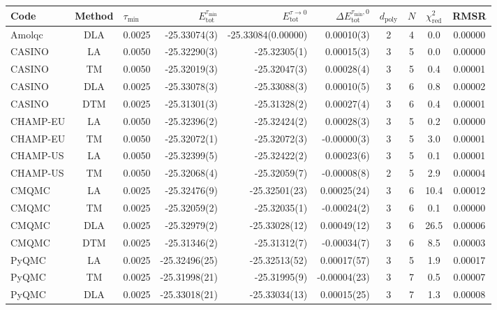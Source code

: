 \begin{tabular}{|lc|lr|r|r|cccc|}
\toprule
Code & Method & $\tau_\text{min}$ & $E_\text{tot}^{\tau_\text{min}}$ & $E_\text{tot}^{\tau\to 0}$ & $\Delta E_\text{tot}^{\tau_\text{min},0}$ & $d_\text{poly}$ & $N$ & $\chi^2_\textrm{red}$ & RMSR \\
\midrule
Amolqc           &  DLA  & 0.0025 & -25.33074(3) & -25.33084(0.00000) & 0.00010(3) & 2 & 4 & 0.0 & 0.00000 \\
CASINO           &  LA   & 0.0050 & -25.32290(3) & -25.32305(1) & 0.00015(3) & 3 & 5 & 0.0 & 0.00000 \\
CASINO           &  TM   & 0.0050 & -25.32019(3) & -25.32047(3) & 0.00028(4) & 3 & 5 & 0.4 & 0.00001 \\
CASINO           &  DLA  & 0.0025 & -25.33078(3) & -25.33088(3) & 0.00010(5) & 3 & 6 & 0.8 & 0.00002 \\
CASINO           &  DTM  & 0.0025 & -25.31301(3) & -25.31328(2) & 0.00027(4) & 3 & 6 & 0.4 & 0.00001 \\
CHAMP-EU         &  LA   & 0.0050 & -25.32396(2) & -25.32424(2) & 0.00028(3) & 3 & 5 & 0.2 & 0.00000 \\
CHAMP-EU         &  TM   & 0.0050 & -25.32072(1) & -25.32072(3) & -0.00000(3) & 3 & 5 & 3.0 & 0.00001 \\
CHAMP-US         &  LA   & 0.0050 & -25.32399(5) & -25.32422(2) & 0.00023(6) & 3 & 5 & 0.1 & 0.00001 \\
CHAMP-US         &  TM   & 0.0050 & -25.32068(4) & -25.32059(7) & -0.00008(8) & 2 & 5 & 2.9 & 0.00004 \\
CMQMC            &  LA   & 0.0025 & -25.32476(9) & -25.32501(23) & 0.00025(24) & 3 & 6 & 10.4 & 0.00012 \\
CMQMC            &  TM   & 0.0025 & -25.32059(2) & -25.32035(1) & -0.00024(2) & 3 & 6 & 0.1 & 0.00000 \\
CMQMC            &  DLA  & 0.0025 & -25.32979(2) & -25.33028(12) & 0.00049(12) & 3 & 6 & 26.5 & 0.00006 \\
CMQMC            &  DTM  & 0.0025 & -25.31346(2) & -25.31312(7) & -0.00034(7) & 3 & 6 & 8.5 & 0.00003 \\
PyQMC            &  LA   & 0.0025 & -25.32496(25) & -25.32513(52) & 0.00017(57) & 3 & 5 & 1.9 & 0.00017 \\
PyQMC            &  TM   & 0.0025 & -25.31998(21) & -25.31995(9) & -0.00004(23) & 3 & 7 & 0.5 & 0.00007 \\
PyQMC            &  DLA  & 0.0025 & -25.33018(21) & -25.33034(13) & 0.00015(25) & 3 & 7 & 1.3 & 0.00008 \\

\end{tabular}
